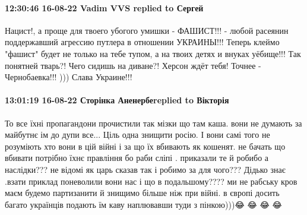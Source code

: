  
 
 
 
 

\paragraph{12:30:46 16-08-22 Vadim VVS replied to Сергей}

Нацист!, а проще для твоего убогого умишки - ФАШИСТ!!! - любой расеянин
поддержавший агрессию путлера в отношении УКРАИНЫ!!! Теперь клеймо "фашист"
будет не только на тебе тупом, а на твоих детях и внуках уёбище!!! Так понятней
тварь?! Чего сидишь на диване?! Херсон ждёт тебя! Точнее - Чернобаевка!!! )))
Слава Украине!!!

\paragraph{13:01:19 16-08-22 Сторінка Аненербеreplied to Вікторія}

То все їхні пропагандони прочистили так мізки що там каша. вони не думають за
майбутнє ім до дупи все... Ціль одна знищити росію. І вони самі того не
розуміють хто вони в цій війні і за що їх вбивають як кошенят. не бачать що
вбивати потрібно їхнє правління бо раби сліпі . приказали те й робибо а
наслідки??? не відомі як царь сказав так і робимо за для чого??? Дідько знає
.взати приклад поневолили вони нас і що в подальшому???? ми не рабську кров
маєм будемо партизанити й знищимо більше ніж при війні. в європі досить багато
українців подають їм каву наплювавши туди з пінкою)))😂 😂 😂 😂
